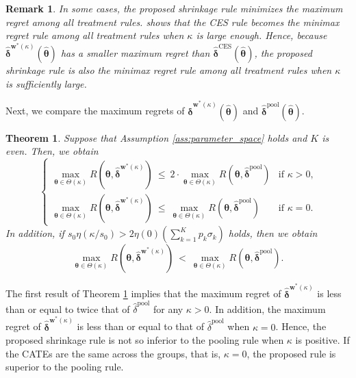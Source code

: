 \documentclass[12pt,a4paper]{article}
\newtheorem{Theorem}{Theorem}
\newtheorem{Remark}{Remark}
\begin{document}
\begin{Remark}\label{rem:Stoye_CES}
In some cases, the proposed shrinkage rule minimizes the maximum regret among all treatment rules. \cite{stoye2012minimax} shows that the CES rule becomes the minimax regret rule among all treatment rules when $\kappa$ is large enough. Hence, because $\hat{\bm{\delta}}^{\bm{w}^{\ast}(\kappa)}(\hat{\bm{\theta}})$ has a smaller maximum regret than $\hat{\bm{\delta}}^{\text{CES}}(\hat{\bm{\theta}})$, the proposed shrinkage rule is also the minimax regret rule among all treatment rules when $\kappa$ is sufficiently large.
\end{Remark}
\fi

Next, we compare the maximum regrets of $\hat{\bm{\delta}}^{\bm{w}^{\ast}(\kappa)}(\hat{\bm{\theta}})$ and $\hat{\bm{\delta}}^{\text{pool}}(\hat{\bm{\theta}})$.

\begin{Theorem}\label{thm:pool_correct}
Suppose that Assumption \ref{ass:parameter_space} holds and $K$ is even. Then, we obtain
\[
\begin{cases}
    \max_{\bm{\theta} \in \Theta(\kappa)} R(\bm{\theta},\hat{\bm{\delta}}^{\bm{w}^{\ast}(\kappa)}) \ \leq \ 2 \cdot \max_{\bm{\theta} \in \Theta(\kappa)} R(\bm{\theta},\hat{\bm{\delta}}^{\mathrm{pool}}) & \text{if $\kappa > 0$,} \\
    \max_{\bm{\theta} \in \Theta(\kappa)} R(\bm{\theta},\hat{\bm{\delta}}^{\bm{w}^{\ast}(\kappa)}) \ \leq \ \max_{\bm{\theta} \in \Theta(\kappa)} R(\bm{\theta},\hat{\bm{\delta}}^{\mathrm{pool}}) & \text{if $\kappa=0$.}
\end{cases}
\]
In addition, if $s_0 \eta(\kappa/s_0) > 2\eta(0) \left( \sum_{k=1}^K p_k \sigma_k \right)$ holds, then we obtain
\begin{equation}
\max_{\bm{\theta} \in \Theta(\kappa)} R(\bm{\theta},\hat{\bm{\delta}}^{\bm{w}^{\ast}(\kappa)}) \ < \ \max_{\bm{\theta} \in \Theta(\kappa)} R(\bm{\theta},\hat{\bm{\delta}}^{\mathrm{pool}}). \label{ineq_pool_correct}
\end{equation}
\end{Theorem}

The first result of Theorem \ref{thm:pool_correct} implies that the maximum regret of $\hat{\bm{\delta}}^{\bm{w}^{\ast}(\kappa)}$ is less than or equal to twice that of $\hat{\delta}^{\mathrm{pool}}$ for any $\kappa > 0$. In addition, the maximum regret of $\hat{\bm{\delta}}^{\bm{w}^{\ast}(\kappa)}$ is less than or equal to that of $\hat{\delta}^{\mathrm{pool}}$ when $\kappa = 0$. Hence, the proposed shrinkage rule is not so inferior to the pooling rule when $\kappa$ is positive. If the CATEs are the same across the groups, that is, $\kappa = 0$, the proposed rule is superior to the pooling rule.
\end{document}
